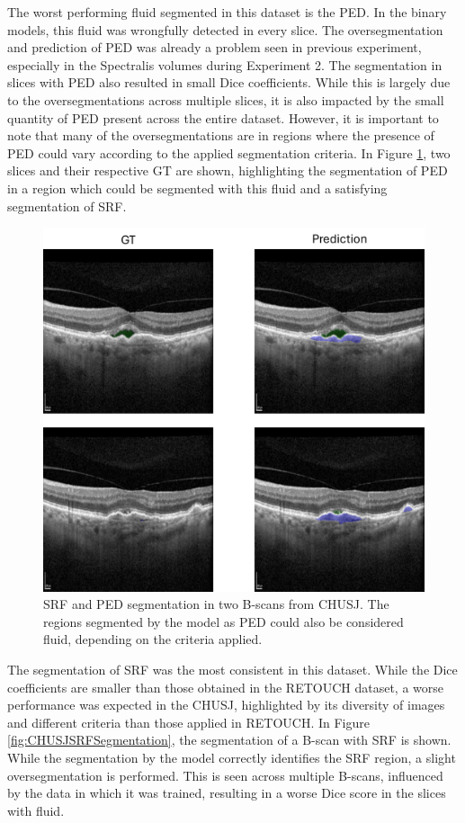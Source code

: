 The worst performing fluid segmented in this dataset is the PED. In the binary models, this fluid was wrongfully detected in every slice. The oversegmentation and prediction of PED was already a problem seen in previous experiment, especially in the Spectralis volumes during Experiment 2. The segmentation in slices with PED also resulted in small Dice coefficients. While this is largely due to the oversegmentations across multiple slices, it is also impacted by the small quantity of PED present across the entire dataset. However, it is important to note that many of the oversegmentations are in regions where the presence of PED could vary according to the applied segmentation criteria. In Figure \ref{fig:CHUSJPEDSegmentation}, two slices and their respective GT are shown, highlighting the segmentation of PED in a region which could be segmented with this fluid and a satisfying segmentation of SRF.

\begin{figure}[!ht]
	\centering
	\includegraphics[width=0.65\linewidth]{figures/CHUSJPEDSegmentation.png}
	\caption{SRF and PED segmentation in two B-scans from CHUSJ. The regions segmented by the model as PED could also be considered fluid, depending on the criteria applied.}
	\label{fig:CHUSJPEDSegmentation}
\end{figure}

The segmentation of SRF was the most consistent in this dataset. While the Dice coefficients are smaller than those obtained in the RETOUCH dataset, a worse performance was expected in the CHUSJ, highlighted by its diversity of images and different criteria than those applied in RETOUCH. In Figure \ref{fig:CHUSJSRFSegmentation}, the segmentation of a B-scan with SRF is shown. While the segmentation by the model correctly identifies the SRF region, a slight oversegmentation is performed. This is seen across multiple B-scans, influenced by the data in which it was trained, resulting in a worse Dice score in the slices with fluid.

